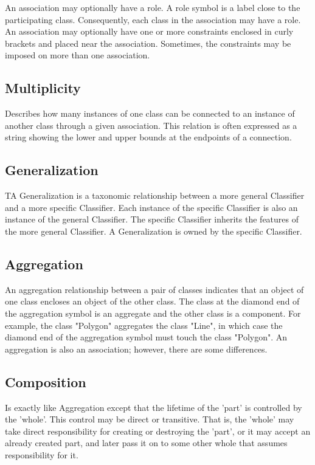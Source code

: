   An association may optionally have a role. A role symbol is a label close to the participating class. Consequently, each class in the association may have a role.\\
  An association may optionally have one or more constraints enclosed in curly brackets and placed near the association. Sometimes, the constraints may be imposed on more than one association. 
\subsection{Multiplicity}
Describes how many instances of one class can be connected to an instance of another class through a given association. This relation is often expressed as a string showing the lower and upper bounds at the endpoints of a connection.

\subsection{Generalization}
TA Generalization is a taxonomic relationship between a more general Classifier and a more specific Classifier. Each instance of the specific Classifier is also an instance of the general Classifier. The specific Classifier inherits the features of the more general Classifier. A Generalization is owned by the specific Classifier.
\subsection{Aggregation}
 An aggregation relationship between a pair of classes indicates that an object of one class encloses an object of the other class. The class at the diamond end of the aggregation symbol is an aggregate and the other class is a component. For example, the class "Polygon" aggregates the class "Line", in which case the diamond end of the aggregation symbol must touch the class "Polygon". An aggregation is also an association; however, there are some differences.
\subsection{Composition}
Is exactly like Aggregation except that the lifetime of the 'part' is controlled by the 'whole'. This control may be direct or transitive. That is, the 'whole' may take direct responsibility for creating or destroying the 'part', or it may accept an already created part, and later pass it on to some other whole that assumes responsibility for it.